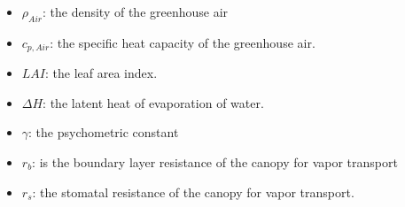 \documentclass[a4paper]{article}
\numberwithin{equation}{section}
\begin{document}
\begin{itemize}
    \item \(\rho_{Air}\): the density of the greenhouse air
    \item \(c_{p,Air}\): the specific heat capacity of the greenhouse air.
    \item \(LAI\): the leaf area index.
    \item \(\Delta H\): the latent heat of evaporation of water.
    \item \(\gamma\): the psychometric constant
    \item \(r_b\): is the boundary layer resistance of the canopy for vapor transport
    \item \(r_s\): the stomatal resistance of the canopy for vapor transport.
\end{itemize}
\end{document}
